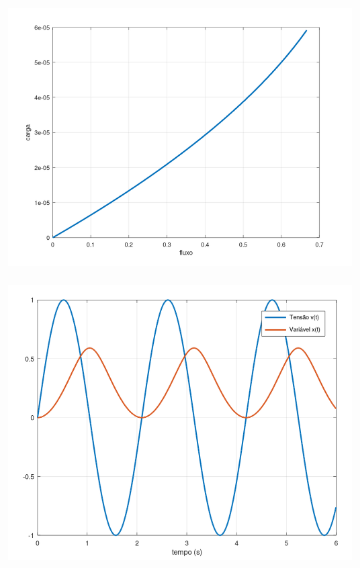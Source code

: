 \documentclass{ceel}
\begin{document}
\begin{multicols}{2}
\begin{figure}[ht]
\centering
\begin{subfigure}{0.33\textwidth}
\centering
\includegraphics[width=\columnwidth]{flux-charge}
\caption{} \label{flux-charge}
\end{subfigure}
\hfill
\begin{subfigure}{0.33\textwidth}
\centering
\includegraphics[width=\columnwidth]{vt-xt}
\caption{} \label{vt:xt}
\end{subfigure}
\hfill
\begin{subfigure}{0.33\textwidth}
\centering

\end{subfigure}
\end{figure}
\end{multicols}
\end{document}
